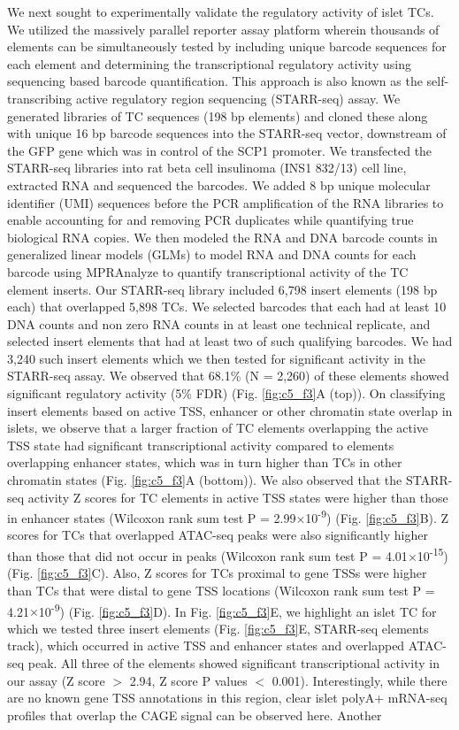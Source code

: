 We next sought to experimentally validate the regulatory activity of islet TCs. We utilized the massively parallel reporter assay platform wherein thousands of elements can be simultaneously tested by including unique barcode sequences for each element and determining the transcriptional regulatory activity using sequencing based barcode quantification. This approach is also known as the self-transcribing active regulatory region sequencing (STARR-seq) assay. We generated libraries of TC sequences (198 bp elements) and cloned these along with unique 16 bp barcode sequences into the STARR-seq vector, downstream of the GFP gene which was in control of the SCP1 promoter. We transfected the STARR-seq libraries into rat beta cell insulinoma (INS1 832/13) cell line, extracted RNA and sequenced the barcodes. We added 8 bp unique molecular identifier (UMI) sequences before the PCR amplification of the RNA libraries to enable accounting for and removing PCR duplicates while quantifying true biological RNA copies. We then modeled the RNA and DNA barcode counts in generalized linear models (GLMs) to model RNA and DNA counts for each barcode using MPRAnalyze \cite{ashuachMPRAnalyzeStatisticalFramework2019} to quantify transcriptional activity of the TC element inserts. Our STARR-seq library included 6,798 insert elements (198 bp each) that overlapped 5,898 TCs. We selected barcodes that each had at least 10 DNA counts and non zero RNA counts in at least one technical replicate, and selected insert elements that had at least two of such qualifying barcodes. We had 3,240 such insert elements which we then tested for significant activity in the STARR-seq assay. We observed that 68.1\% (N = 2,260) of these elements showed significant regulatory activity (5\% FDR) (Fig. \ref{fig:c5_f3}A (top)). On classifying insert elements based on active TSS, enhancer or other chromatin state overlap in islets, we observe that a larger fraction of TC elements overlapping the active TSS state had significant transcriptional activity compared to elements overlapping enhancer states, which was in turn higher than TCs in other chromatin states (Fig. \ref{fig:c5_f3}A (bottom)). We also observed that the STARR-seq activity Z scores for TC elements in active TSS states were higher than those in enhancer states (Wilcoxon rank sum test P = 2.99$\times$10\textsuperscript{-9}) (Fig. \ref{fig:c5_f3}B). Z scores for TCs that overlapped ATAC-seq peaks were also significantly higher than those that did not occur in peaks (Wilcoxon rank sum test P = 4.01$\times$10\textsuperscript{-15}) (Fig. \ref{fig:c5_f3}C). Also, Z scores for TCs proximal to gene TSSs were higher than TCs that were distal to gene TSS locations (Wilcoxon rank sum test P = 4.21$\times$10\textsuperscript{-9}) (Fig. \ref{fig:c5_f3}D). In Fig. \ref{fig:c5_f3}E, we highlight an islet TC for which we tested three insert elements (Fig. \ref{fig:c5_f3}E, STARR-seq elements track), which occurred in active TSS and enhancer states and overlapped ATAC-seq peak. All three of the elements showed significant transcriptional activity in our assay (Z score $>$ 2.94, Z score P values $<$ 0.001). Interestingly, while there are no known gene TSS annotations in this region, clear islet polyA+ mRNA-seq profiles that overlap the CAGE signal can be observed here. Another 